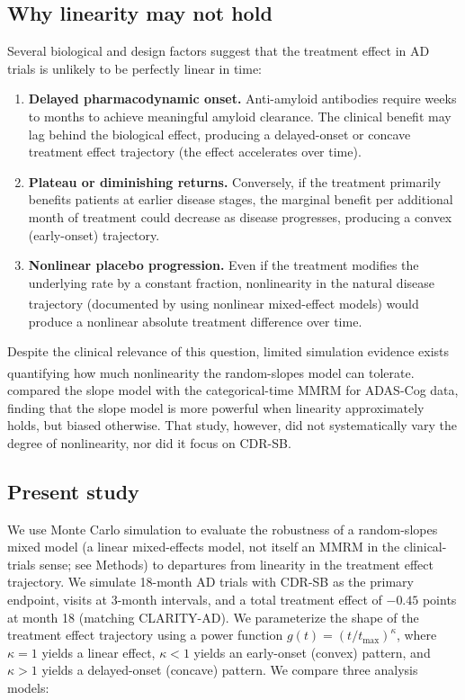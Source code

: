 \documentclass[
  11pt,
]{article}
\begin{document}
\subsection{Why linearity may not hold}\label{why-linearity-may-not-hold}

Several biological and design factors suggest that the
treatment effect in AD trials is unlikely to be perfectly
linear in time:

\begin{enumerate}
\def\labelenumi{\arabic{enumi}.}
\item
  \textbf{Delayed pharmacodynamic onset.} Anti-amyloid
  antibodies require weeks to months to achieve meaningful
  amyloid clearance. The clinical benefit may lag behind
  the biological effect, producing a delayed-onset or
  concave treatment effect trajectory (the effect
  accelerates over time).
\item
  \textbf{Plateau or diminishing returns.} Conversely, if the
  treatment primarily benefits patients at earlier disease
  stages, the marginal benefit per additional month of
  treatment could decrease as disease progresses,
  producing a convex (early-onset) trajectory.
\item
  \textbf{Nonlinear placebo progression.} Even if the treatment
  modifies the underlying rate by a constant fraction,
  nonlinearity in the natural disease trajectory
  (documented by\textsuperscript{} using nonlinear
  mixed-effect models) would produce a nonlinear absolute
  treatment difference over time.
\end{enumerate}

Despite the clinical relevance of this question, limited
simulation evidence exists quantifying how much nonlinearity
the random-slopes model can tolerate.\textsuperscript{}
compared the slope model with the categorical-time MMRM for
ADAS-Cog data, finding that the slope model is more powerful
when linearity approximately holds, but biased otherwise.
That study, however, did not systematically vary the degree
of nonlinearity, nor did it focus on CDR-SB.

\subsection{Present study}\label{present-study}

We use Monte Carlo simulation to evaluate the
robustness of a random-slopes mixed model (a linear
mixed-effects model, not itself an MMRM in the clinical-trials
sense; see Methods) to departures from linearity in the
treatment effect trajectory. We simulate 18-month AD trials
with CDR-SB as the primary endpoint, visits at 3-month
intervals, and a total treatment effect of \(-0.45\) points at
month 18 (matching CLARITY-AD). We parameterize the shape of
the treatment effect trajectory using a power function
\(g(t) = (t/t_{\max})^\kappa\), where \(\kappa = 1\) yields a
linear effect, \(\kappa < 1\) yields an early-onset (convex)
pattern, and \(\kappa > 1\) yields a delayed-onset (concave)
pattern. We compare three analysis models:
\end{document}
